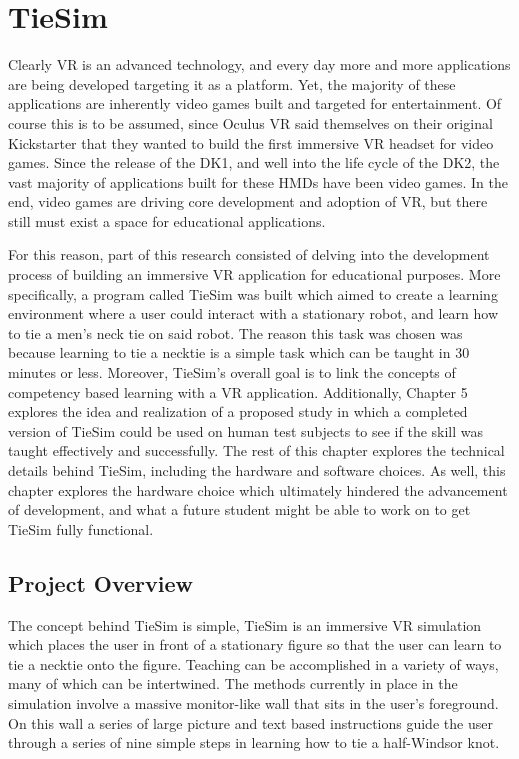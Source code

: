 \chapter{TieSim}
\label{chap:tiesim}

Clearly VR is an advanced technology, and every day more and more applications are being developed targeting it as a platform. Yet, the majority of these applications are inherently video games built and targeted for entertainment. Of course this is to be assumed, since Oculus VR said themselves on their original Kickstarter that they wanted to build the first immersive VR headset for video games. Since the release of the DK1, and well into the life cycle of the DK2, the vast majority of applications built for these HMDs have been video games. In the end, video games are driving core development and adoption of VR, but there still must exist a space for educational applications.

For this reason, part of this research consisted of delving into the development process of building an immersive VR application for educational purposes. More specifically, a program called TieSim was built which aimed to create a learning environment where a user could interact with a stationary robot, and learn how to tie a men's neck tie on said robot. The reason this task was chosen was because learning to tie a necktie is a simple task which can be taught in 30 minutes or less. Moreover, TieSim's overall goal is to link the concepts of competency based learning with a VR application. Additionally, Chapter 5 explores the idea and realization of a proposed study in which a completed version of TieSim could be used on human test subjects to see if the skill was taught effectively and successfully. The rest of this chapter explores the technical details behind TieSim, including the hardware and software choices. As well, this chapter explores the hardware choice which ultimately hindered the advancement of development, and what a future student might be able to work on to get TieSim fully functional.

\section{Project Overview}
\label{sec:project}

The concept behind TieSim is simple, TieSim is an immersive VR simulation which places the user in front of a stationary figure so that the user can learn to tie a necktie onto the figure. Teaching can be accomplished in a variety of ways, many of which can be intertwined. The methods currently in place in the simulation involve a massive monitor-like wall that sits in the user's foreground. On this wall a series of large picture and text based instructions guide the user through a series of nine simple steps in learning how to tie a half-Windsor knot. 

